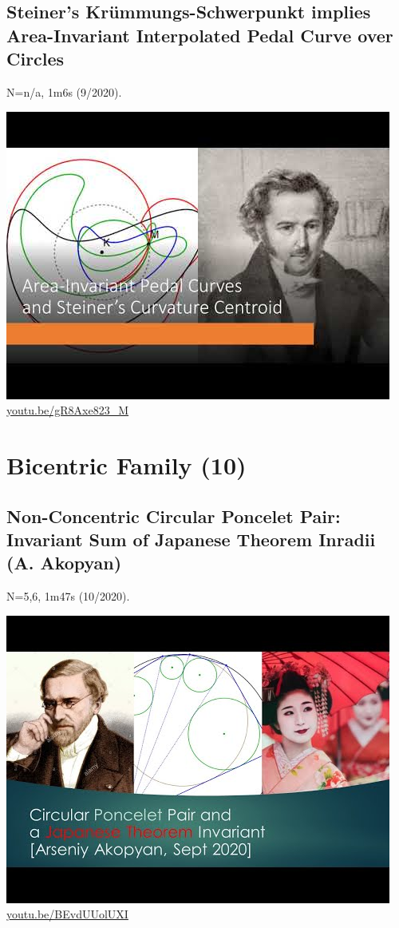 \documentclass[12pt]{amsart}
\begin{document}
\subsection{Steiner's Krümmungs-Schwerpunkt implies Area-Invariant Interpolated Pedal Curve over Circles}
\label{vid:gR8Axe823_M}
\noindent N=n/a, 1m6s (9/2020). 
\begin{center}\includegraphics[width=.5\textwidth]{pics/gR8Axe823_M.jpg} \\ 
\href{https://youtu.be/gR8Axe823_M}{\url{youtu.be/gR8Axe823\_M}}\end{center}
% 


\section{Bicentric Family (10)}

\subsection{Non-Concentric Circular Poncelet Pair: Invariant Sum of Japanese Theorem Inradii (A. Akopyan)}
\label{vid:BEvdUUolUXI}
\noindent N=5,6, 1m47s (10/2020). 
\begin{center}\includegraphics[width=.5\textwidth]{pics/BEvdUUolUXI.jpg} \\ 
\href{https://youtu.be/BEvdUUolUXI}{\url{youtu.be/BEvdUUolUXI}}\end{center}
% 
\end{document}
